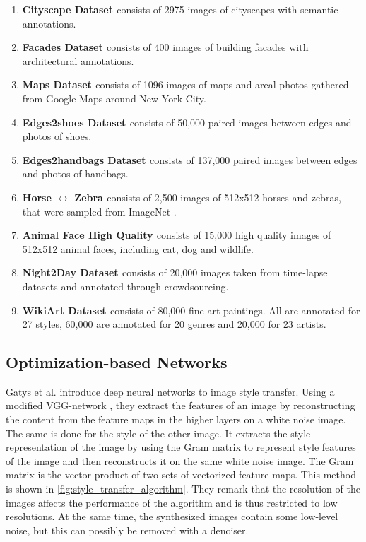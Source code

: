 \begin{enumerate}
	\item \textbf{Cityscape Dataset \cite{Cordts2016}} consists of 2975 images of cityscapes with semantic annotations.
	\item \textbf{Facades Dataset \cite{Tylecek2013}} consists of 400 images of building facades with architectural annotations.
	\item \textbf{Maps Dataset \cite{Isola2016}} consists of 1096 images of maps and areal photos gathered from Google Maps around New York City.
	\item \textbf{Edges2shoes Dataset \cite{Yu2014}} consists of 50,000 paired images between edges and photos of shoes.
	\item \textbf{Edges2handbags Dataset \cite{Zhu2016}} consists of 137,000 paired images between edges and photos of handbags.
	\item \textbf{Horse $\leftrightarrow$ Zebra \cite{Zhu2017}} consists of 2,500 images of 512x512 horses and zebras, that were sampled from ImageNet \cite{Deng2009}.
	\item \textbf{Animal Face High Quality \cite{Choi2019}} consists of 15,000 high quality images of 512x512 animal faces, including cat, dog and wildlife.
	\item \textbf{Night2Day Dataset \cite{Laffont2014}} consists of 20,000 images taken from time-lapse datasets and annotated through crowdsourcing.
	\item \textbf{WikiArt Dataset \cite{Saleh2015}} consists of 80,000 fine-art paintings.
	All are annotated for 27 styles, 60,000 are annotated for 20 genres and 20,000 for 23 artists.
\end{enumerate}

\subsection{Optimization-based Networks}
Gatys et al. \cite{Gatys2016} introduce deep neural networks to image style transfer.
Using a modified VGG-network \cite{Simonyan2015}, they extract the features of an image by reconstructing the content from the feature maps in the higher layers on a white noise image.
The same is done for the style of the other image.
It extracts the style representation of the image by using the Gram matrix to represent style features of the image and then reconstructs it on the same white noise image.
The Gram matrix is the vector product of two sets of vectorized feature maps.
This method is shown in \ref{fig:style_transfer_algorithm}.
They remark that the resolution of the images affects the performance of the algorithm and is thus restricted to low resolutions.
At the same time, the synthesized images contain some low-level noise, but this can possibly be removed with a denoiser.

